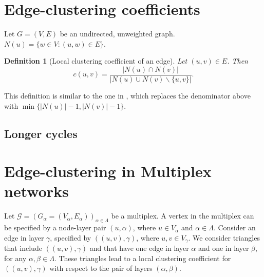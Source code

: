 \documentclass[twocolumn]{IEEEtran}
\newtheorem{definition}{Definition}
\theoremstyle{definition}
\begin{document}
\section{Edge-clustering coefficients}
Let $G = (V, E)$ be an undirected, unweighted graph.
$N(u) = \{ w \in V : (u,w) \in E \}$.
\begin{definition}[Local clustering coefficient of an edge]
  Let $(u,v) \in E$. Then
    \[ c(u,v) = \frac{ | N(u) \cap N(v) | }{ | N(u) \cup N(v) \backslash \{u, v \} | }. \]
\end{definition}

This definition is similar to the one in \cite{}, which replaces
the denominator above with $\min \{ |N(u)| - 1, |N(v)| - 1\}$.

\subsection{Longer cycles}
\section{Edge-clustering in Multiplex networks}
Let $\mathscr{G} = ( G_\alpha = (V_\alpha, E_\alpha) )_{\alpha \in \Lambda} $ be a multiplex.
A vertex in the multiplex can be specified by a node-layer pair $(u, \alpha)$, where $u \in V_\alpha$
and $\alpha \in \Lambda$.
Consider an edge in layer $\gamma$, 
specified by $((u,v), \gamma)$, where $u,v \in V_\gamma$.
We consider triangles that include $((u,v), \gamma)$
and that have one edge in layer $\alpha$ and one in layer $\beta$,
for any $\alpha, \beta \in \Lambda$. These triangles
lead to a local clustering coefficient for $((u,v), \gamma )$ with
respect to the pair of layers $(\alpha, \beta)$.
\end{document}
